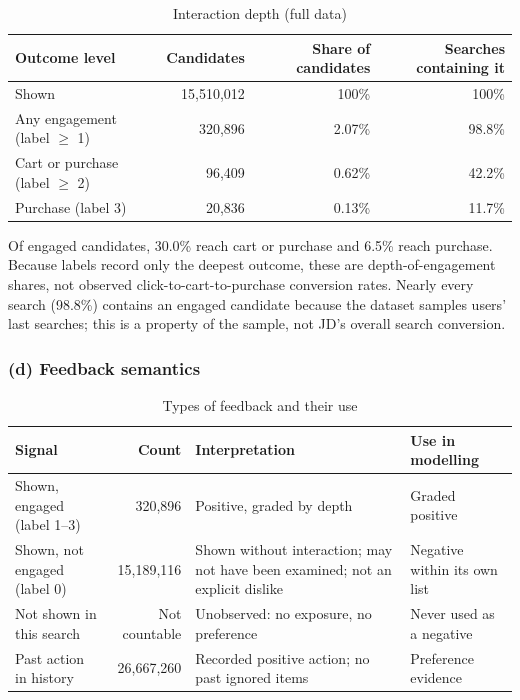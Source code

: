\documentclass[11pt,a4paper]{article}
\newcommand{\hd}[1]{\textbf{#1}}
\newcommand{\tablestyle}{\small}
\newcommand{\headrow}{}
\begin{document}
\begin{table}[H]
\caption{Interaction depth (full data)}
\tablestyle
\centering
\begin{tabularx}{\textwidth}{L R R R}
\toprule
\headrow \hd{Outcome level} & \hd{Candidates} & \hd{Share of candidates} & \hd{Searches containing it} \\
\midrule
Shown & 15,510,012 & 100\% & 100\% \\
Any engagement (label $\geq$ 1) & 320,896 & 2.07\% & 98.8\% \\
Cart or purchase (label $\geq$ 2) & 96,409 & 0.62\% & 42.2\% \\
Purchase (label 3) & 20,836 & 0.13\% & 11.7\% \\
\bottomrule
\end{tabularx}
\end{table}

Of engaged candidates, 30.0\% reach cart or purchase and 6.5\% reach purchase. Because labels record only the deepest outcome, these are depth-of-engagement shares, not observed click-to-cart-to-purchase conversion rates. Nearly every search (98.8\%) contains an engaged candidate because the dataset samples users' last searches; this is a property of the sample, not JD's overall search conversion.

\subsubsection{(d) Feedback semantics}

\begin{table}[H]
\caption{Types of feedback and their use}
\tablestyle
\centering
\begin{tabularx}{\textwidth}{>{\raggedright\arraybackslash}p{3.3cm} R L L}
\toprule
\headrow \hd{Signal} & \hd{Count} & \hd{Interpretation} & \hd{Use in modelling} \\
\midrule
Shown, engaged (label 1--3) & 320,896 & Positive, graded by depth & Graded positive \\
Shown, not engaged (label 0) & 15,189,116 & Shown without interaction; may not have been examined; not an explicit dislike & Negative within its own list \\
Not shown in this search & Not countable & Unobserved: no exposure, no preference & Never used as a negative \\
Past action in history & 26,667,260 & Recorded positive action; no past ignored items & Preference evidence \\
\bottomrule
\end{tabularx}
\end{table}
\end{document}
